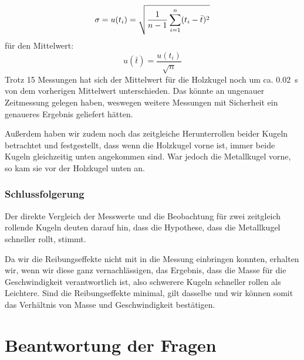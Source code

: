\documentclass[11pt,a4paper,titlepage, ngerman]{article}
\begin{document}
				\begin{equation*}
					\sigma = u(t_i) = \sqrt{\frac{1}{n-1} \sum_{i=1}^{n} (t_i - \bar{t})^2} \\			
				\end{equation*} 				
				für den Mittelwert:
				\begin{equation*}
					u(\bar{t}) = \frac{u(t_i)}{\sqrt{n}}
				\end{equation*}				
				Trotz 15 Messungen hat sich der Mittelwert für die Holzkugel noch um ca. \SI{0.02}{s} von dem vorherigen Mittelwert unterschieden. Das könnte an ungenauer Zeitmessung gelegen haben, weswegen weitere Messungen mit Sicherheit ein genaueres Ergebnis geliefert hätten.
				
				Außerdem haben wir zudem noch das zeitgleiche Herunterrollen beider Kugeln betrachtet und festgestellt, dass wenn die Holzkugel vorne ist, immer beide Kugeln gleichzeitig unten angekommen sind. War jedoch die Metallkugel vorne, so kam sie vor der Holzkugel unten an.	
			
			\subsubsection{Schlussfolgerung}
				\label{2.3.3}
				
				Der direkte Vergleich der Messwerte und die Beobachtung für zwei zeitgleich rollende Kugeln deuten darauf hin, dass die Hypothese, dass die Metallkugel schneller rollt, stimmt. 
				
				Da wir die Reibungseffekte nicht mit in die Messung einbringen konnten, erhalten wir, wenn wir diese ganz vernachlässigen, das Ergebnis, dass die Masse für die Geschwindigkeit verantwortlich ist, also schwerere Kugeln schneller rollen als Leichtere. 
				Sind die Reibungseffekte minimal, gilt dasselbe und wir können somit das Verhältnis von Masse und Geschwindigkeit bestätigen. 
				
	\newpage		
	\section{Beantwortung der Fragen}	
		\label{Diskussion}	
		
\end{document}
